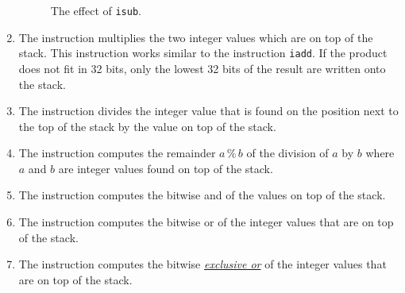 \begin{enumerate}
\setlength{\unitlength}{0.5cm}
\begin{figure}[!ht]
  \centering
{}
  \caption{The effect of \texttt{isub}.}
  \label{fig:ijvm-sub}
\end{figure}

\item The instruction 
      multiplies the two integer values which are on top of the stack.  This instruction works similar to
      the instruction \texttt{iadd}.  If the product does not fit in 32 bits, only the lowest 32 bits of
      the result are written onto the stack. 
\item The instruction 
      divides the integer value that is found on the position next to the  top of the stack by the value
      on top of the stack. 
\item The instruction 
      computes the remainder $a \,\texttt{\%}\, b$ of the division of $a$ by $b$ where $a$ and $b$ are
      integer values found on top of the stack.
\item The instruction 
      computes the bitwise and of the values on top of the stack.
\item The instruction 
      computes the bitwise or of the integer values that are on top of the stack.
\item The instruction 
      computes the bitwise \href{http://en.wikipedia.org/wiki/Exclusive_or}{\emph{exclusive or}} of
      the integer values that are on top of the stack. 
\end{enumerate}

